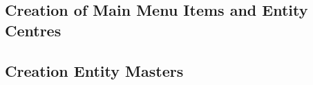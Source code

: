 % 
%       
% 
% 
% 
% 
% 
  
  
  
  \subsection{Creation of Main Menu Items and Entity Centres}
  
  
  \subsection{Creation Entity Masters}
  
